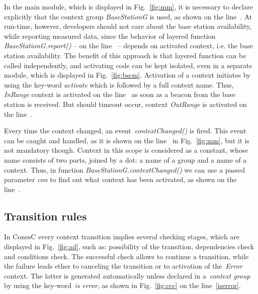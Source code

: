 

In the main module, which is displayed in Fig.~\ref{fig:mm}, it is necessary to declare
explicitly that the context group \emph{BaseStationG} is used, as shown on the line~.
At run-time, however, developers should not care about the base station availability, while
reporting measured data, since the behavior of layered function
\emph{BaseStationG.report()} -- on the line~ -- depends on activated
context, i.e. the base station availability. The benefit of
this approach is that layered function can be called independently, and activating code
can be kept isolated, even in a separate module, which is displayed in Fig.~\ref{fig:bscm}.
Activation of a context initiates by using the key-word
\emph{activate} which is followed by a full context name. Thus,
\emph{InRange} context is activated on the line~ as soon as a
beacon from the base station is received. But should timeout occur, context
\emph{OutRange} is activated on the line~.





Every time the context changed, an event~\emph{contextChanged()} is fired. This event can be
caught and handled, as it is shown on the line~ in Fig.~\ref{fig:mm},
but it is not mandatory though. Context in this scope is considered as a constant,
whose name consists of two parts, joined by a dot: a name of a group and a name
of a context. Thus, in function \emph{BaseStationG.contextChanged()} we can use
a passed parameter \emph{con} to find out what context has been activated, as
shown on the line~.

\subsection{Transition rules}\label{subsec:rules}

In ConesC every context transition implies several checking stages, which are displayed in
Fig.~\ref{fig:ad}, such as: possibility of the transition, dependencies check and conditions
check. The successful check allows to continue a transition, while the failure leads ether to
canceling the transition or to activation of the~\emph{Error} context. The latter is generated
automatically unless declared in a~\emph{context group} by using the key-word~\emph{is error},
as shown in Fig.~\ref{fig:ccc} on the line~\ref{iserror}.

